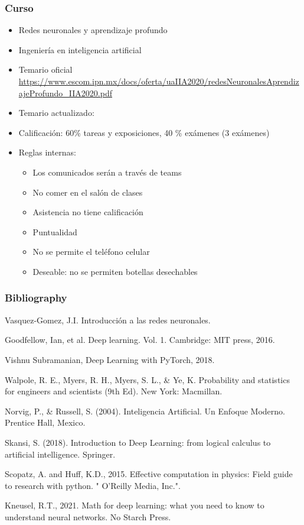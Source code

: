 \documentclass[aspectratio=169]{beamer}
\begin{document}
\begin{frame}
	\frametitle{Curso}
	\begin{itemize}
		\item Redes neuronales y aprendizaje profundo
		\item Ingeniería en inteligencia artificial
		\item Temario oficial
		\url{https://www.escom.ipn.mx/docs/oferta/uaIIA2020/redesNeuronalesAprendizajeProfundo_IIA2020.pdf}
		\item Temario actualizado: %
		\item Calificación: 60\% tareas y exposiciones, 40 \% exámenes (3 exámenes)
		\pause
		\item Reglas internas:
		\begin{itemize}
			\item Los comunicados serán a través de teams
			\item No comer en el salón de clases
			\item Asistencia no tiene calificación
			\item Puntualidad
			\item No se permite el teléfono celular
			\item Deseable: no se permiten botellas desechables
		\end{itemize}
	\end{itemize}
\end{frame}


\begin{frame}
\frametitle{Bibliography}
\begin{itemize}
{\small 		
		\item Vasquez-Gomez, J.I. Introducción a las redes neuronales.
		\item Goodfellow, Ian, et al. Deep learning. Vol. 1. Cambridge: MIT press, 2016.
		\item Vishnu Subramanian, Deep Learning with PyTorch, 2018.
		\item Walpole, R. E., Myers, R. H., Myers, S. L., \& Ye, K. Probability and statistics for engineers and scientists (9th Ed). New York: Macmillan.
		\item Norvig, P., \& Russell, S. (2004). Inteligencia Artificial. Un Enfoque Moderno. Prentice Hall, Mexico.
		\item Skansi, S. (2018). Introduction to Deep Learning: from logical calculus to artificial intelligence. Springer.
		\item Scopatz, A. and Huff, K.D., 2015. Effective computation in physics: Field guide to research with python. " O'Reilly Media, Inc.".
		\item Kneusel, R.T., 2021. Math for deep learning: what you need to know to understand neural networks. No Starch Press.
}
\end{itemize}
\end{frame}
\end{document}
